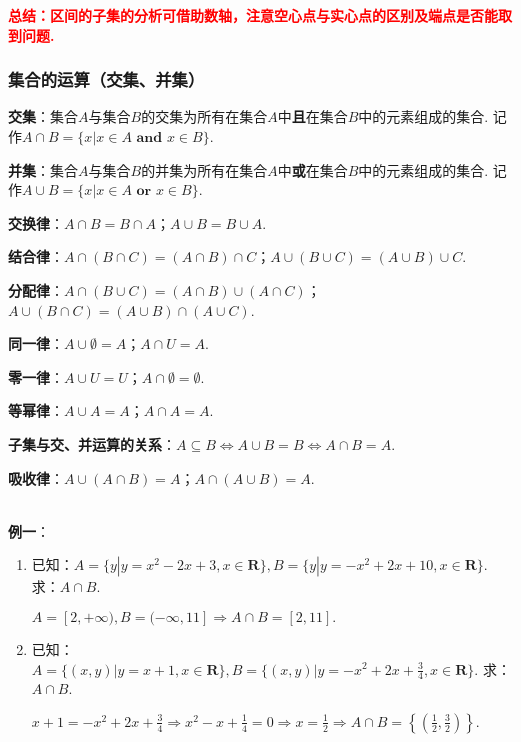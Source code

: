 \documentclass[8pt]{article}
\begin{document}
				\textcolor{red}{\textbf{总结：区间的子集的分析可借助数轴，注意空心点与实心点的区别及端点是否能取到问题.}}

			\subsubsection{集合的运算（交集、并集）}

				\textbf{交集}：集合$A$与集合$B$的交集为所有在集合$A$中\textbf{且}在集合$B$中的元素组成的集合. 记作$A\cap B=\{x|x\in A\textbf{ and }x\in B\}.$

				\textbf{并集}：集合$A$与集合$B$的并集为所有在集合$A$中\textbf{或}在集合$B$中的元素组成的集合. 记作$A\cup B=\{x|x\in A\textbf{ or }x\in B\}.$

				\textbf{交换律}：$A\cap B=B\cap A$；$A\cup B=B\cup A$.

				\textbf{结合律}：$A\cap (B\cap C) = (A\cap B)\cap C$；$A\cup (B\cup C) = (A\cup B)\cup C$.

				\textbf{分配律}：$A\cap(B\cup C)=(A\cap B)\cup(A\cap C)$；$A\cup(B\cap C)=(A\cup B)\cap(A\cup C)$.

				\textbf{同一律}：$A\cup\emptyset=A$；$A\cap U=A$.

				\textbf{零一律}：$A\cup U=U$；$A\cap\emptyset=\emptyset$.

				\textbf{等幂律}：$A\cup A=A$；$A\cap A=A$.

				\textbf{子集与交、并运算的关系}：$A\subseteq B\Leftrightarrow A\cup B=B \Leftrightarrow A\cap B=A$.

				\textbf{吸收律}：$A\cup(A\cap B)=A$；$A\cap(A\cup B)=A$.

				~\\

				\textbf{例一}：

				\begin{enumerate}[label=(\arabic*)]
					\item 已知：$A=\{y|y=x^2-2x+3, x\in\mathbf{R}\}, B=\{y|y=-x^2+2x+10,x\in\mathbf{R}\}.$ 求：$A\cap B$.

						$A=[2, +\infty), B=(-\infty, 11] \Rightarrow A\cap B=[2, 11].$

					\item 已知：$A=\{(x,y)|y=x+1, x\in\mathbf{R}\}, B=\{(x,y)|y=-x^2+2x+\frac{3}{4},x\in\mathbf{R}\}.$ 求：$A\cap B$.

						$\displaystyle x+1=-x^2+2x+\frac{3}{4} \Rightarrow x^2-x+\frac{1}{4}=0 \Rightarrow x=\frac{1}{2} \Rightarrow A\cap B=\left\{\left(\frac{1}{2}, \frac{3}{2}\right)\right\}.$
				\end{enumerate}
\end{document}
